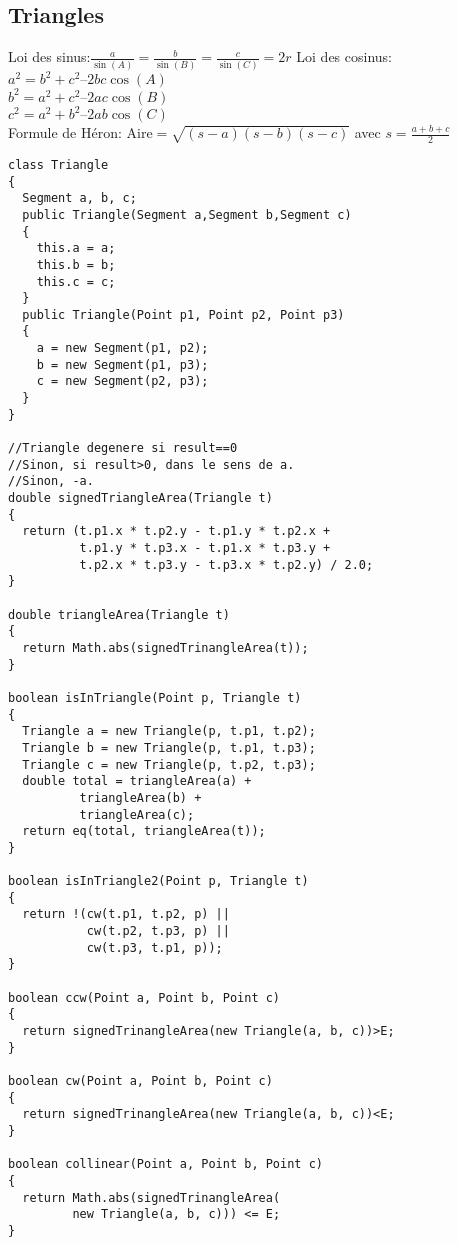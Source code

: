\subsection{Triangles}
Loi des sinus:$\frac{a}{\sin(A)}=\frac{b}{\sin(B)}=\frac{c}{\sin(C)}=2r$
Loi des cosinus:\\
$a^2 = b^2 + c^2 – 2bc\cos(A)$\\
$b^2 = a^2 + c^2 – 2ac\cos(B)$\\
$c^2 = a^2 + b^2 – 2ab\cos(C)$\\
Formule de Héron: Aire$=\sqrt{(s-a)(s-b)(s-c)}$ avec $s=\frac{a+b+c}{2}$
\begin{lstlisting}
class Triangle
{
  Segment a, b, c;
  public Triangle(Segment a,Segment b,Segment c)
  {
    this.a = a;
    this.b = b;
    this.c = c;
  }
  public Triangle(Point p1, Point p2, Point p3)
  {
    a = new Segment(p1, p2);
    b = new Segment(p1, p3);
    c = new Segment(p2, p3);
  }
}

//Triangle degenere si result==0
//Sinon, si result>0, dans le sens de a.
//Sinon, -a.
double signedTriangleArea(Triangle t)
{
  return (t.p1.x * t.p2.y - t.p1.y * t.p2.x +
          t.p1.y * t.p3.x - t.p1.x * t.p3.y +
          t.p2.x * t.p3.y - t.p3.x * t.p2.y) / 2.0;
}
	
double triangleArea(Triangle t)
{
  return Math.abs(signedTrinangleArea(t));
}

boolean isInTriangle(Point p, Triangle t)
{
  Triangle a = new Triangle(p, t.p1, t.p2);
  Triangle b = new Triangle(p, t.p1, t.p3);
  Triangle c = new Triangle(p, t.p2, t.p3);
  double total = triangleArea(a) +
		  triangleArea(b) +
		  triangleArea(c);
  return eq(total, triangleArea(t));
}

boolean isInTriangle2(Point p, Triangle t)
{
  return !(cw(t.p1, t.p2, p) ||
           cw(t.p2, t.p3, p) ||
           cw(t.p3, t.p1, p));
}

boolean ccw(Point a, Point b, Point c)
{
  return signedTrinangleArea(new Triangle(a, b, c))>E;
}

boolean cw(Point a, Point b, Point c)
{
  return signedTrinangleArea(new Triangle(a, b, c))<E;
}

boolean collinear(Point a, Point b, Point c)
{
  return Math.abs(signedTrinangleArea(
         new Triangle(a, b, c))) <= E;
}
\end{lstlisting}
